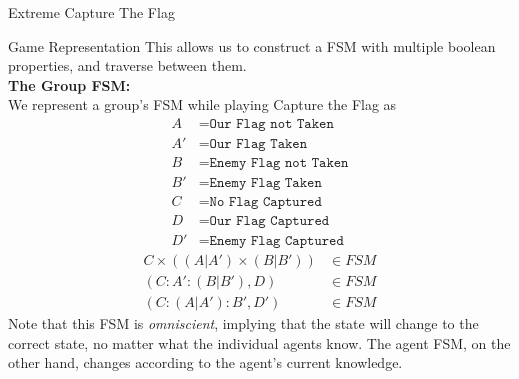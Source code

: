 \documentclass[11pt]{article}
\begin{document}
\begin{section}{Extreme Capture The Flag}
\begin{subsection}{Game Representation}
This allows us to construct a FSM with multiple boolean properties, and traverse between them.\\

\textbf{The Group FSM:}\\
We represent a group's FSM while playing Capture the Flag as
\begin{align*}
A &= \texttt{Our Flag not Taken}\\
A' &= \texttt{Our Flag Taken}\\
B &= \texttt{Enemy Flag not Taken}\\
B' &= \texttt{Enemy Flag Taken}\\
C &= \texttt{No Flag Captured}\\
D &= \texttt{Our Flag Captured}\\
D' &= \texttt{Enemy Flag Captured}
\end{align*}
\begin{align*}
C \times ((A | A') \times (B | B')) &\in FSM\\
(C:A':(B|B'), D) &\in FSM\\
(C:(A|A'):B', D') &\in FSM
\end{align*}
Note that this FSM is \emph{omniscient}, implying that the state will change to the correct state, no matter what the individual agents know. The agent FSM, on the other hand, changes according to the agent's current knowledge. \\


\end{subsection}
\end{section}
\end{document}
